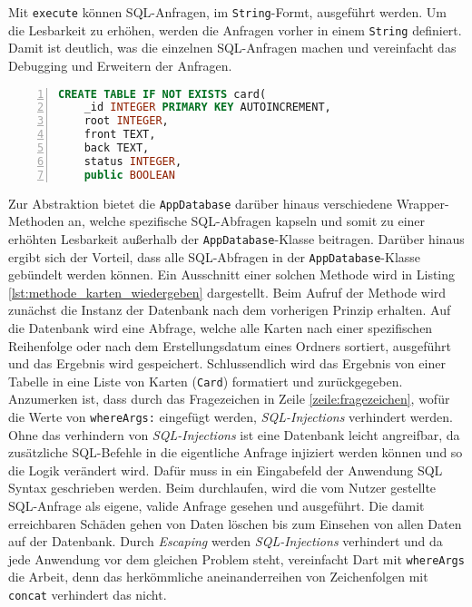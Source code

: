 Mit \texttt{execute} können SQL-Anfragen, im \texttt{String}-Formt, ausgeführt werden. Um die Lesbarkeit zu erhöhen, werden die Anfragen vorher in einem \texttt{String} definiert. Damit ist deutlich, was die einzelnen SQL-Anfragen machen und vereinfacht das Debugging und Erweitern der Anfragen.

\begin{lstlisting}[caption={Erstellen der Datenbank},language=sql,captionpos=b,label={lst:_createDatabase},numbers=left,frame=none,escapechar=|]
CREATE TABLE IF NOT EXISTS card(
    _id INTEGER PRIMARY KEY AUTOINCREMENT,
    root INTEGER,
    front TEXT,
    back TEXT,
    status INTEGER,
    public BOOLEAN
\end{lstlisting}

Zur Abstraktion bietet die \texttt{AppDatabase} darüber hinaus verschiedene Wrapper-Methoden an, welche spezifische SQL-Abfragen kapseln und somit zu einer erhöhten Lesbarkeit außerhalb der \texttt{AppDatabase}-Klasse beitragen. Darüber hinaus ergibt sich der Vorteil, dass alle SQL-Abfragen in der \texttt{AppDatabase}-Klasse gebündelt werden können. Ein Ausschnitt einer solchen Methode wird in Listing \ref{lst:methode_karten_wiedergeben} dargestellt. Beim Aufruf der Methode wird zunächst die Instanz der Datenbank nach dem vorherigen Prinzip erhalten. Auf die Datenbank wird eine Abfrage, welche alle Karten nach einer spezifischen Reihenfolge oder nach dem Erstellungsdatum eines Ordners sortiert, ausgeführt und das Ergebnis wird gespeichert. Schlussendlich wird das Ergebnis von einer Tabelle in eine Liste von Karten (\texttt{Card}) formatiert und zurückgegeben. Anzumerken ist, dass durch das Fragezeichen in Zeile \ref{zeile:fragezeichen}, wofür die Werte von \texttt{whereArgs:} eingefügt werden, \textit{SQL-Injections} verhindert werden. Ohne das verhindern von \textit{SQL-Injections} ist eine Datenbank leicht angreifbar, da zusätzliche SQL-Befehle in die eigentliche Anfrage injiziert werden können und so die Logik verändert wird. Dafür muss in ein Eingabefeld der Anwendung SQL Syntax geschrieben werden. Beim durchlaufen, wird die vom Nutzer gestellte SQL-Anfrage als eigene, valide Anfrage gesehen und ausgeführt. Die damit erreichbaren Schäden gehen von Daten löschen bis zum Einsehen von allen Daten auf der Datenbank. Durch \textit{Escaping} werden \textit{SQL-Injections} verhindert und da jede Anwendung vor dem gleichen Problem steht, vereinfacht Dart mit \texttt{whereArgs} die Arbeit, denn das herkömmliche aneinanderreihen von Zeichenfolgen mit \texttt{concat} verhindert das nicht.


